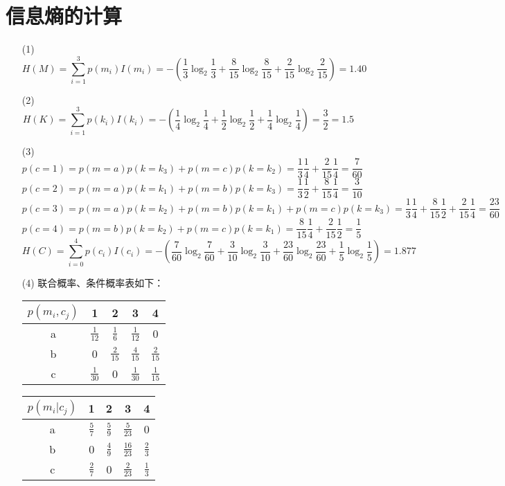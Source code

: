 \documentclass{article}
\date{\today}
\begin{document}
\makecover

\section*{信息熵的计算}
\begin{itemize}
    \item [(1)]
\[H(M) = \sum_{i=1}^{3}p(m_i)I(m_i) = -(\frac{1}{3}\log_2{\frac{1}{3}} 
+ \frac{8}{15}\log_2{\frac{8}{15}} + \frac{2}{15}\log_2{\frac{2}{15}}) = 1.40\]
\item [(2)]
\[H(K)=\sum_{i=1}^{3}p(k_i)I(k_i)=-(\frac{1}{4}\log_2{\frac{1}{4}}+\frac{1}{2}\log_2{\frac{1}{2}}+
\frac{1}{4} \log_2{\frac{1}{4}})=\frac{3}{2}=1.5\]
\item [(3)]
\[p(c=1) = p(m=a)p(k=k_3)+p(m=c)p(k=k_2) = \frac{1}{3}\frac{1}{4}+\frac{2}{15}\frac{1}{4}=\frac{7}{60}\]
\[p(c=2) = p(m=a)p(k=k_1)+p(m=b)p(k=k_3) = \frac{1}{3}\frac{1}{2} + \frac{8}{15}\frac{1}{4}=\frac{3}{10}\]
\[p(c=3) = p(m=a)p(k=k_2) +p(m=b)p(k=k_1) + p(m=c)p(k=k_3) = \frac{1}{3}\frac{1}{4} + \frac{8}{15}\frac{1}{2} + \frac{2}{15}\frac{1}{4} = \frac{23}{60}\]
\[p(c=4) = p(m=b)p(k=k_2) + p(m=c)p(k=k_1) = \frac{8}{15}\frac{1}{4} + \frac{2}{15}\frac{1}{2} = \frac{1}{5} \]
\[H(C)=\sum_{i=0}^{4}p(c_i)I(c_i) = -(\frac{7}{60}\log_2{\frac{7}{60}} + \frac{3}{10}\log_2\frac{3}{10} + \frac{23}{60}\log_2\frac{23}{60} + \frac{1}{5}\log_2{\frac{1}{5}})=1.877\]

\item [(4)]
联合概率、条件概率表如下：

\begin{tabular}{ccccc}
\hline
$p(m_i,c_j)$ & 1 & 2 & 3 & 4 \\
\hline
a & $\frac{1}{12}$ & $\frac{1}{6}$ & $\frac{1}{12}$ & 0 \\
b & 0 & $\frac{2}{15}$ & $\frac{4}{15}$ & $\frac{2}{15}$ \\
c & $\frac{1}{30}$ & 0 & $\frac{1}{30}$ & $\frac{1}{15}$ \\
\hline
\end{tabular}
\begin{tabular}{ccccc}
\hline
$p(m_i|c_j)$&1&2&3&4\\
\hline
a & $\frac{5}{7}$ & $\frac{5}{9}$ & $\frac{5}{23}$ & 0 \\
b & 0 & $\frac{4}{9}$ & $\frac{16}{23}$ & $\frac{2}{3}$ \\
c & $\frac{2}{7}$ & 0 & $\frac{2}{23}$ & $\frac{1}{3}$ \\
\hline
\end{tabular}


\end{itemize}
\end{document}
